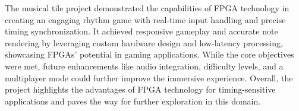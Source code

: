 \documentclass{subfile}
\begin{document}
 
The musical tile project demonstrated the capabilities of FPGA technology in creating an engaging rhythm game with real-time input handling and precise timing synchronization. It achieved responsive gameplay and accurate note rendering by leveraging custom hardware design and low-latency processing, showcasing FPGAs' potential in gaming applications. While the core objectives were met, future enhancements like audio integration, difficulty levels, and a multiplayer mode could further improve the immersive experience. Overall, the project highlights the advantages of FPGA technology for timing-sensitive applications and paves the way for further exploration in this domain.
\end{document}
